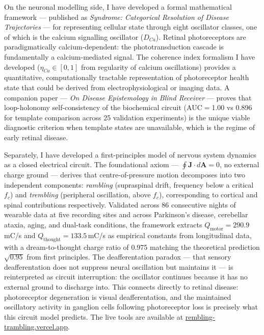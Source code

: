 \documentclass[12pt,a4paper]{article}
\begin{document}
On the neuronal modelling side, I have developed a formal mathematical framework ---
published as \textit{Syndrome: Categorical Resolution of Disease Trajectories} ---
for representing cellular state through eight oscillator classes, one of which is the
calcium signalling oscillator ($D_{Ca}$). Retinal photoreceptors are paradigmatically
calcium-dependent: the phototransduction cascade is fundamentally a calcium-mediated
signal. The coherence index formalism I have developed ($\eta_{Ca} \in [0,1]$ from
regularity of calcium oscillations) provides a quantitative, computationally tractable
representation of photoreceptor health state that could be derived from
electrophysiological or imaging data. A companion paper ---
\textit{On Disease Epistemology in Blind Receiver} --- proves that loop-holonomy
self-consistency of the biochemical circuit (AUC$=$1.00 vs 0.896 for template comparison
across 25 validation experiments) is the unique viable diagnostic criterion when template
states are unavailable, which is the regime of early retinal disease.

Separately, I have developed a first-principles model of nervous system dynamics as
a closed electrical circuit. The foundational axiom --- $\oint \mathbf{J} \cdot d\mathbf{A} = 0$,
no external charge ground --- derives that centre-of-pressure motion decomposes into
two independent components: \textit{rambling} (supraspinal drift, frequency below a
critical $f_c$) and \textit{trembling} (peripheral oscillation, above $f_c$), corresponding
to cortical and spinal contributions respectively. Validated across 86 consecutive
nights of wearable data at five recording sites and across Parkinson's disease,
cerebellar ataxia, aging, and dual-task conditions, the framework extracts
$Q_\text{motor} = 290.9$\,mC/s and $Q_\text{thought} = 133.5$\,mC/s as empirical
constants from longitudinal data, with a dream-to-thought charge ratio of 0.975
matching the theoretical prediction $\sqrt{0.95}$ from first principles.
The deafferentation paradox --- that sensory deafferentation does not suppress neural
oscillation but maintains it --- is reinterpreted as circuit interruption: the
oscillator continues because it has no external ground to discharge into.
This connects directly to retinal disease: photoreceptor degeneration is
visual deafferentation, and the maintained oscillatory activity in ganglion cells
following photoreceptor loss is precisely what this circuit model predicts.
The live tools are available at
\href{https://rembling-trambling.vercel.app/tools/rambling}{rembling-trambling.vercel.app}.
\end{document}
